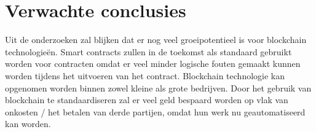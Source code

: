 \documentclass[fleqn,10pt]{voorstel}
\begin{document}
\section{Verwachte conclusies}
\label{sec:verwachte_conclusies}

Uit de onderzoeken zal blijken dat er nog veel groeipotentieel is voor blockchain technologieën. Smart contracts zullen in de toekomst als standaard gebruikt worden voor contracten omdat er veel minder logische fouten gemaakt kunnen worden tijdens het uitvoeren van het contract. Blockchain technologie kan opgenomen worden binnen zowel kleine als grote bedrijven. Door het gebruik van blockchain te standaardiseren zal er veel geld bespaard worden op vlak van onkosten / het betalen van derde partijen, omdat hun werk nu geautomatiseerd kan worden.  


\nocite{*}
\printbibliography[heading=bibintoc]
\end{document}
